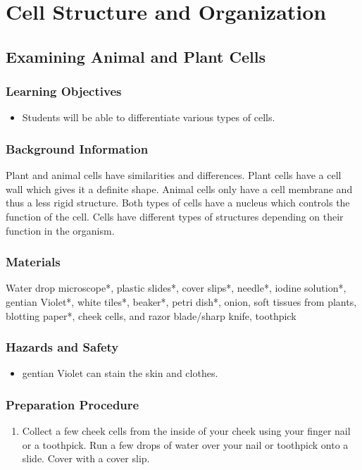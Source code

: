 \section{Cell Structure and Organization}
\subsection{Examining Animal and Plant Cells}

\subsubsection*{Learning Objectives}
\begin{itemize}
\item{Students will be able to differentiate various types of cells.}
\end{itemize}

\subsubsection*{Background Information}
Plant and animal cells have similarities and differences. Plant cells have a cell wall which gives it a definite shape. Animal cells only have a cell membrane and thus a less rigid structure. Both types of cells have a nucleus which controls the function of the cell. Cells have different types of structures depending on their function in the organism.

\subsubsection*{Materials}
Water drop microscope*, plastic slides*, cover slips*, needle*, iodine solution*, gentian Violet*, white tiles*, beaker*, petri dish*, onion, soft tissues from plants, blotting paper*, cheek cells, and razor blade/sharp knife, toothpick

\subsubsection*{Hazards and Safety}
\begin{itemize}
\item{gentian Violet can stain the skin and clothes.}
\end{itemize}

\subsubsection*{Preparation Procedure}
\begin{enumerate}
\item{Collect a few cheek cells from the inside of your cheek using your finger nail or a toothpick. Run a few drops of water over your nail or toothpick onto a slide. Cover with a cover slip.}
\end{enumerate}

